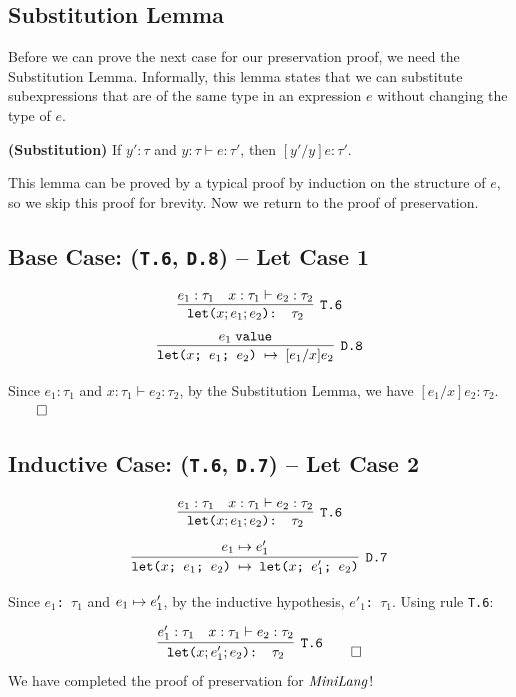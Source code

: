 \subsection{Substitution Lemma}
Before we can prove the next case for our preservation
proof, we need the Substitution Lemma.
Informally, this lemma states that 
we can substitute subexpressions that are of the same type in
an expression $e$ without changing the type of $e$.

\begin{lem}
\textbf{(Substitution)}
If $y' : \tau$ and $y : \tau \vdash e : \tau'$,
then $[y' / y]e : \tau'$.
\end{lem}

This lemma can be proved by a typical proof by
induction on the structure of $e$, so we skip
this proof for brevity.
Now we return to the proof of preservation.

\subsection{Base Case: (\texttt{T.6}, \texttt{D.8}) -- Let Case 1}
\[
\cinfer[T.6]{let($x; e_1; e_2$): $\tau_2$}
  {e_1: \tau_1
   &
   x : \tau_1 \vdash e_2: \tau_2
  }
\]
\[
\cinfer[D.8]{let($x$; $e_1$; $e_2$) $\stepto$ $[e_1 / x]e_2$}{e_1 \; \texttt{value}}
\]

Since $e_1: \tau_1$ and $x : \tau_1 \vdash e_2: \tau_2$,
by the Substitution Lemma, we have $[e_1 / x]e_2 : \tau_2$.
$\qed$

\subsection{Inductive Case: (\texttt{T.6}, \texttt{D.7}) -- Let Case 2}
\[
\cinfer[T.6]{let($x; e_1; e_2$): $\tau_2$}
  {e_1: \tau_1
   &
   x : \tau_1 \vdash e_2: \tau_2
  }
\]
\[
\cinfer[D.7]{let($x$; $e_1$; $e_2$) $\stepto$ let($x$; $e'_1$; $e_2$)}{e_1 \stepto e'_1}
\]

Since \texttt{$e_1$: $\tau_1$} and $e_1 \mapsto e'_1$,
by the inductive hypothesis, \texttt{$e'_1$: $\tau_1$}.
Using rule \texttt{T.6}:

\[
\cinfer[T.6]{let($x; e'_1; e_2$): $\tau_2$}
  {e'_1: \tau_1
   &
   x : \tau_1 \vdash e_2: \tau_2
  }
\qed
\]
We have completed the proof of preservation for $\mathit{MiniLang}$!

